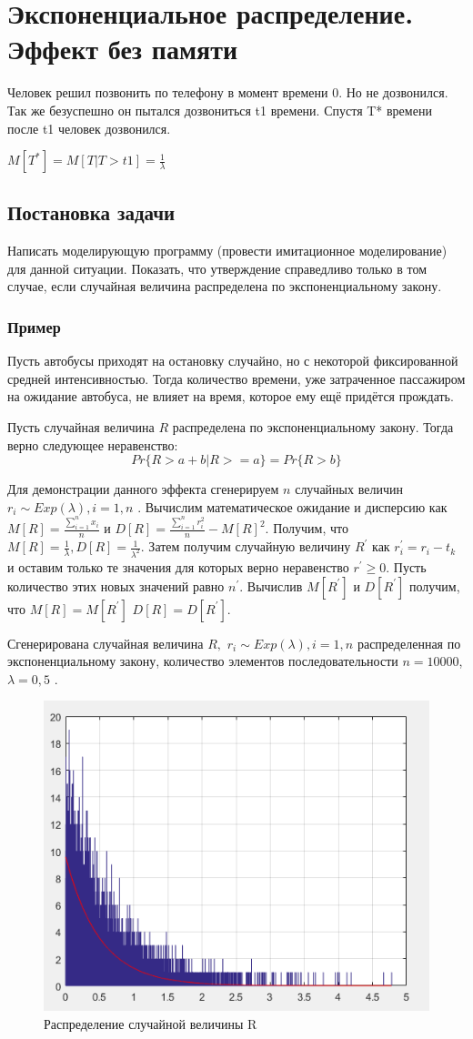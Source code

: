 \section{Экспоненциальное распределение. Эффект без памяти}
Человек решил позвонить по телефону в момент времени 0. Но не дозвонился.
Так же безуспешно он пытался дозвониться t1 времени. Спустя T{*} времени после t1 человек дозвонился. 
\begin{center}
	$M[T^{*}]=M[T\vert T>t1]=\frac{1}{\lambda}$
\end{center}
\subsection{Постановка задачи}
Написать моделирующую программу (провести имитационное моделирование)
для данной ситуации. Показать, что утверждение справедливо только
в том случае, если случайная величина распределена по экспоненциальному
закону. 

\subsubsection{Пример}
Пусть автобусы приходят на остановку случайно, но с некоторой фиксированной
средней интенсивностью. Тогда количество времени, уже затраченное
пассажиром на ожидание автобуса, не влияет на время, которое ему ещё
придётся прождать. 

Пусть случайная величина $ R $ распределена по экспоненциальному закону. Тогда верно следующее неравенство:
\[ P{r}\{R>a+b | R>=a\}=Pr\{R>b\} \]

Для демонстрации данного эффекта сгенерируем $n$ случайных величин
$r_{i}\sim Exp(\lambda),i=1,n$ . Вычислим математическое
ожидание и дисперсию как $M[R]=\frac{\sum_{i=1}^{n}x_{i}}{n}$
и $D[R]=\frac{\sum_{i=1}^{n}r_{i}^{2}}{n}-M[R]^{2}$. Получим, что $M[R]=\frac{1}{\lambda}, D[R]=\frac{1}{\lambda^{2}}$. Затем получим случайную величину $R^{'}$ как $r_{i}^{'}=r_{i}-t_{k}$ и оставим только те значения для которых верно неравенство $r^{'}\geq0$. Пусть количество этих новых значений равно $n^{'}$. Вычислив $M[R^{'}]$
и $D[R^{'}]$ получим, что $M[R]=M[R^{'}]$
$D[R]=D[R^{'}]$.

Сгенерирована случайная величина $R,$ $r_{i}\sim Exp(\lambda),i=1,n$
распределенная по экспоненциальному закону, количество элементов последовательности
$n=10000$, $\lambda=0,5$ . 

\begin{figure}[h]
	\centering\includegraphics[width=0.4\linewidth]{img/kich_bur/image1.png}
	\caption{Распределение случайной величины R}
	\label{fig:img1}
\end{figure}

